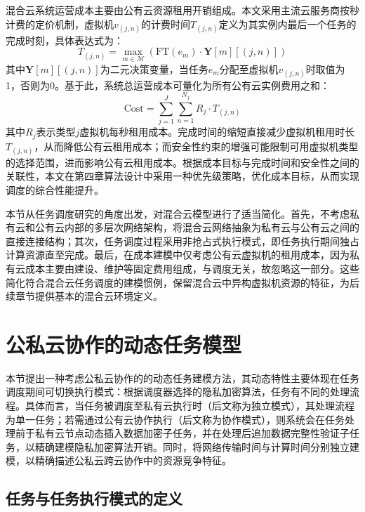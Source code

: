 混合云系统运营成本主要由公有云资源租用开销组成。本文采用主流云服务商按秒计费的定价机制，虚拟机$v_{(j,n)}$的计费时间$T_{(j,n)}$定义为其实例内最后一个任务的完成时刻，具体表达式为：
\begin{equation}
    T_{(j,n)} = \max_{m \in \mathcal{M}} \left( \text{FT}(e_m) \cdot \mathbf{Y}[m][(j,n)] \right)
    \label{eq:vm-time}
\end{equation}
其中$\mathbf{Y}[m][(j,n)]$为二元决策变量，当任务$e_m$分配至虚拟机$v_{(j,n)}$时取值为1，否则为0。基于此，系统总运营成本可量化为所有公有云实例费用之和：
\begin{equation}
    \text{Cost} = \sum_{j=1}^J \sum_{n=1}^{N_j} R_j \cdot T_{(j,n)}
    \label{eq:cost}
\end{equation}
其中$R_j$表示类型$j$虚拟机每秒租用成本。完成时间的缩短直接减少虚拟机租用时长$T_{(j,n)}$，从而降低公有云租用成本；而安全性约束的增强可能限制可用虚拟机类型的选择范围，进而影响公有云租用成本。根据成本目标与完成时间和安全性之间的关联性，本文在第四章算法设计中采用一种优先级策略，优化成本目标，从而实现调度的综合性能提升。

本节从任务调度研究的角度出发，对混合云模型进行了适当简化。首先，不考虑私有云和公有云内部的多层次网络架构，将混合云网络抽象为私有云与公有云之间的直接连接结构；其次，任务调度过程采用非抢占式执行模式，即任务执行期间独占计算资源直至完成。最后，在成本建模中仅考虑公有云虚拟机的租用成本，因为私有云成本主要由建设、维护等固定费用组成，与调度无关，故忽略这一部分。这些简化符合混合云任务调度的建模惯例\cite{wangAdaptiveCloudBundle2023}，保留混合云中异构虚拟机资源的特征，为后续章节提供基本的混合云环境定义。

\section{公私云协作的动态任务模型}\label{sec:task-model}

本节提出一种考虑公私云协作的的动态任务建模方法，其动态特性主要体现在任务调度期间可切换执行模式：根据调度器选择的隐私加密算法，任务有不同的处理流程。具体而言，当任务被调度至私有云执行时（后文称为独立模式），其处理流程为单一任务；若需通过公有云协作执行（后文称为协作模式），则系统会在任务处理前于私有云节点动态插入数据加密子任务，并在处理后追加数据完整性验证子任务，以精确建模隐私加密算法开销。同时，将网络传输时间与计算时间分别独立建模，以精确描述公私云跨云协作中的资源竞争特征。

\subsection{任务与任务执行模式的定义}

